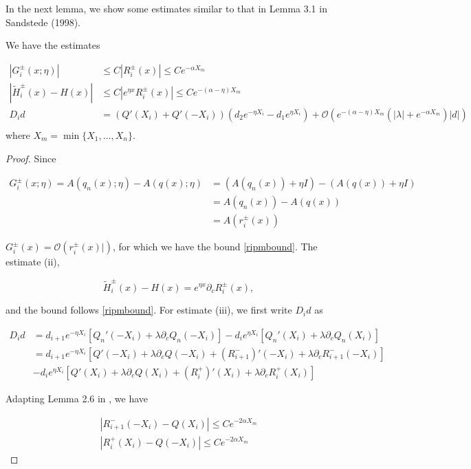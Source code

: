 \documentclass[thesis.tex]{subfiles}
\begin{document}
In the next lemma, we show some estimates similar to that in Lemma 3.1 in Sandstede (1998).


\begin{lemma}\label{estimates}

We have the estimates

\begin{align*}
|G_i^\pm(x; \eta)| &\leq C|R_i^\pm(x)| \leq C e^{-\alpha X_m} \\
| \tilde{H}_i^\pm(x)  - H(x) | & \leq C | e^{\eta x} R_i^\pm(x)| \leq C e^{-(\alpha - \eta) X_m}  \\
D_i d &= ( Q'(X_i) + Q'(-X_i) )(d_2 e^{-\eta X_i} - d_1 e^{\eta X_i}) + \mathcal{O} \left( e^{-(\alpha - \eta) X_m}\left( |\lambda| +  e^{-\alpha X_m} \right) |d| \right) \\
\end{align*}
where $X_m = \min\{X_1, \dots, X_n\}$.

\begin{proof}
Since 

\begin{align*}
G_i^\pm(x; \eta) = A(q_n(x); \eta) - A(q(x); \eta) &= (A(q_n(x)) + \eta I) - (A(q(x)) + \eta I) \\
&= A(q_n(x)) - A(q(x)) \\
&= A(r_i^\pm(x))
\end{align*}

$G_i^\pm(x) = \mathcal{O}(r_i^\pm(x)|)$, for which we have the bound \eqref{ripmbound}. The estimate (ii),

\[
\tilde{H}_i^\pm(x)  - H(x) = e^{\eta x} \partial_c R_i^\pm(x),
\]

and the bound follows \eqref{ripmbound}. For estimate (iii), we first write $D_i d$ as

\begin{align*}
D_i d &= d_{i+1} e^{-\eta X_i}[ Q_n'(-X_i) + \lambda \partial_c Q_n(-X_i)] 
- d_i e^{\eta X_i}[ Q_n'(X_i) + \lambda \partial_c Q_n(X_i)]  \\
&= d_{i+1} e^{-\eta X_i} [ Q'(-X_i) + \lambda \partial_c Q(-X_i) + (R_{i+1}^-)'(-X_i) + \lambda  \partial_c R_{i+1}^-(-X_i)] \\
&- d_i e^{\eta X_i} [ Q'(X_i) + \lambda \partial_c Q(X_i) + (R_i^+)'(X_i) + \lambda \partial_c R_i^+(X_i)] 
\end{align*}

Adapting Lemma 2.6 in \cite{Sandstede1998}, we have

\begin{align*}
|R_{i+1}^-(-X_i) - Q(X_i)| \leq C e^{-2 \alpha X_m} \\
|R_{i}^+(X_i) - Q(-X_i)| \leq C e^{-2 \alpha X_m}
\end{align*}


\end{proof}
\end{lemma}
\end{document}
